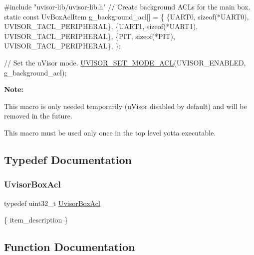 \begin{DoxyCode}
\textcolor{preprocessor}{#include "uvisor-lib/uvisor-lib.h"}
\textcolor{comment}{// Create background ACLs for the main box. }
\textcolor{keyword}{static} \textcolor{keyword}{const} UvBoxAclItem g\_background\_acl[] = \{
  \{UART0,      \textcolor{keyword}{sizeof}(*UART0), UVISOR\_TACL\_PERIPHERAL\},
  \{UART1,      \textcolor{keyword}{sizeof}(*UART1), UVISOR\_TACL\_PERIPHERAL\},
  \{PIT,        \textcolor{keyword}{sizeof}(*PIT),  UVISOR\_TACL\_PERIPHERAL\},
\};

\textcolor{comment}{// Set the uVisor mode. }
\hyperlink{group__hypervisor_gae90f548ce110da855610f79301aafe34}{UVISOR\_SET\_MODE\_ACL}(UVISOR\_ENABLED, g\_background\_acl);
\end{DoxyCode}


{\bfseries Note\+:}


\begin{DoxyEnumerate}
\item This macro is only needed temporarily (u\+Visor disabled by default) and will be removed in the future.
\item This macro must be used only once in the top level yotta executable.
\end{DoxyEnumerate}

\subsection{Typedef Documentation}
\hypertarget{group__hypervisor_ga1527b3a7e3df3007490669cbd26b4fe9}{}\label{group__hypervisor_ga1527b3a7e3df3007490669cbd26b4fe9}
\subsubsection{\texorpdfstring{Uvisor\+Box\+Acl}{UvisorBoxAcl}}
{\footnotesize\ttfamily typedef uint32\+\_\+t \hyperlink{group__hypervisor_ga1527b3a7e3df3007490669cbd26b4fe9}{Uvisor\+Box\+Acl}}

\{ item\+\_\+description \}

\subsection{Function Documentation}
\hypertarget{group__hypervisor_ga6e7f7b03367daefa2cbcb7e4f0538ba7}{}\label{group__hypervisor_ga6e7f7b03367daefa2cbcb7e4f0538ba7}
